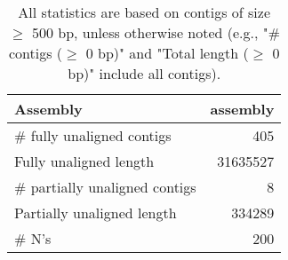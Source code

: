 \documentclass[12pt,a4paper]{article}
\begin{document}
\begin{table}[ht]
\begin{center}
\caption{All statistics are based on contigs of size $\geq$ 500 bp, unless otherwise noted (e.g., "\# contigs ($\geq$ 0 bp)" and "Total length ($\geq$ 0 bp)" include all contigs).}
\begin{tabular}{|l*{1}{|r}|}
\hline
Assembly & assembly \\ \hline
\# fully unaligned contigs & 405 \\ \hline
Fully unaligned length & 31635527 \\ \hline
\# partially unaligned contigs & 8 \\ \hline
Partially unaligned length & 334289 \\ \hline
\# N's & 200 \\ \hline
\end{tabular}
\end{center}
\end{table}
\end{document}
